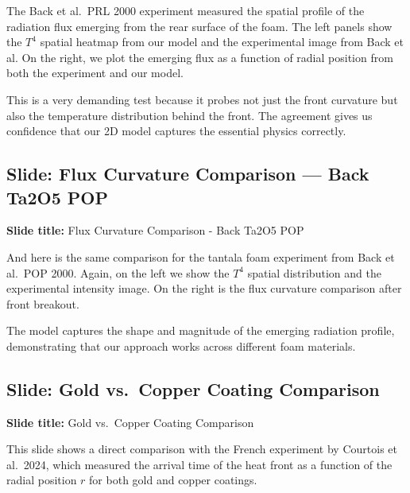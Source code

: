 \documentclass[12pt, a4paper]{article}
\begin{document}
The Back et al.\ PRL 2000 experiment measured the spatial profile of the radiation flux emerging from the rear surface of the foam. The left panels show the $T^4$ spatial heatmap from our model and the experimental image from Back et al. On the right, we plot the emerging flux as a function of radial position from both the experiment and our model.

This is a very demanding test because it probes not just the front curvature but also the temperature distribution behind the front. The agreement gives us confidence that our 2D model captures the essential physics correctly.

\subsection{Slide: Flux Curvature Comparison --- Back Ta2O5 POP}

\begin{slidebox}
\textbf{Slide title:} Flux Curvature Comparison - Back Ta2O5 POP
\end{slidebox}

And here is the same comparison for the tantala foam experiment from Back et al.\ POP 2000. Again, on the left we show the $T^4$ spatial distribution and the experimental intensity image. On the right is the flux curvature comparison after front breakout.

The model captures the shape and magnitude of the emerging radiation profile, demonstrating that our approach works across different foam materials.

\subsection{Slide: Gold vs.\ Copper Coating Comparison}

\begin{slidebox}
\textbf{Slide title:} Gold vs.\ Copper Coating Comparison
\end{slidebox}

This slide shows a direct comparison with the French experiment by Courtois et al.\ 2024, which measured the arrival time of the heat front as a function of the radial position $r$ for both gold and copper coatings.
\end{document}
